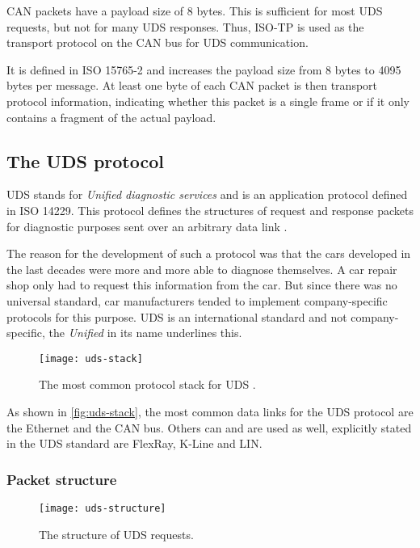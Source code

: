 CAN packets have a payload size of 8 bytes. This is sufficient for most UDS requests, but not for many UDS responses. Thus, ISO-TP is used as the transport protocol on the CAN bus for UDS communication.

It is defined in ISO 15765-2 and increases the payload size from 8 bytes to 4095 bytes per message. At least one byte of each CAN packet is then transport protocol information, indicating whether this packet is a single frame or if it only contains a fragment of the actual payload.

\subsection{The UDS protocol}

UDS stands for \emph{Unified diagnostic services} and is an application protocol defined in ISO 14229. This protocol defines the structures of request and response packets for diagnostic purposes sent over an arbitrary data link \cite{iso14229}.

The reason for the development of such a protocol was that the cars developed in the last decades were more and more able to diagnose themselves. A car repair shop only had to request this information from the car. But since there was no universal standard, car manufacturers tended to implement company-specific protocols for this purpose. UDS is an international standard and not company-specific, the \emph{Unified} in its name underlines this. 

\begin{figure}[h]
    \centering
    \texttt{[image: uds-stack]}
    \caption{The most common protocol stack for UDS \cite{Weiss2020}.}
    \label{fig:uds-stack}
\end{figure}

As shown in \autoref{fig:uds-stack}, the most common data links for the UDS protocol are the Ethernet and the CAN bus. Others can and are used as well, explicitly stated in the UDS standard are FlexRay, K-Line and LIN.

\subsubsection{Packet structure}

\begin{figure}[h]
    \centering
    \texttt{[image: uds-structure]}
    \caption{The structure of UDS requests.}
    \label{fig:uds-structure}
\end{figure}

